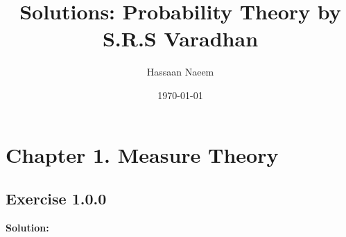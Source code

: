 \documentclass{article}
\title{Solutions: Probability Theory by S.R.S Varadhan}
\author{Hassaan Naeem}
\date{\today}
\begin{document}
\maketitle

\section*{Chapter 1. Measure Theory}
\subsection*{Exercise 1.0.0}

\textbf{Solution:}
\end{document}
